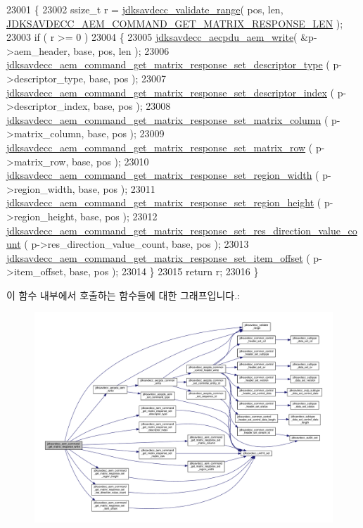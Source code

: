 \begin{DoxyCode}
23001 \{
23002     ssize\_t r = \hyperlink{group__util_ga9c02bdfe76c69163647c3196db7a73a1}{jdksavdecc\_validate\_range}( pos, len, 
      \hyperlink{group__command__get__matrix__response_ga1e5cff1febbf3cdec919f94c81e3161d}{JDKSAVDECC\_AEM\_COMMAND\_GET\_MATRIX\_RESPONSE\_LEN} );
23003     \textcolor{keywordflow}{if} ( r >= 0 )
23004     \{
23005         \hyperlink{group__aecpdu__aem_gad658e55771cce77cecf7aae91e1dcbc5}{jdksavdecc\_aecpdu\_aem\_write}( &p->aem\_header, base, pos, len );
23006         \hyperlink{group__command__get__matrix__response_ga5d3bbb8b993435678aa79add5f92fd32}{jdksavdecc\_aem\_command\_get\_matrix\_response\_set\_descriptor\_type}
      ( p->descriptor\_type, base, pos );
23007         \hyperlink{group__command__get__matrix__response_ga90b5890d1ed3e00d4415a92381daef32}{jdksavdecc\_aem\_command\_get\_matrix\_response\_set\_descriptor\_index}
      ( p->descriptor\_index, base, pos );
23008         \hyperlink{group__command__get__matrix__response_ga9f938d30a1b2d2f60d7cda173386be03}{jdksavdecc\_aem\_command\_get\_matrix\_response\_set\_matrix\_column}
      ( p->matrix\_column, base, pos );
23009         \hyperlink{group__command__get__matrix__response_ga49b1cec10016e943a1315de0c149a62a}{jdksavdecc\_aem\_command\_get\_matrix\_response\_set\_matrix\_row}
      ( p->matrix\_row, base, pos );
23010         \hyperlink{group__command__get__matrix__response_gad476529cadbe62a7665e3906983fb8fc}{jdksavdecc\_aem\_command\_get\_matrix\_response\_set\_region\_width}
      ( p->region\_width, base, pos );
23011         \hyperlink{group__command__get__matrix__response_ga567114d5982537c21f3248a7332de0d1}{jdksavdecc\_aem\_command\_get\_matrix\_response\_set\_region\_height}
      ( p->region\_height, base, pos );
23012         \hyperlink{group__command__get__matrix__response_ga22f5abaa9b2eb23ecfef424496a9c15c}{jdksavdecc\_aem\_command\_get\_matrix\_response\_set\_res\_direction\_value\_count}
      ( p->res\_direction\_value\_count, base, pos );
23013         \hyperlink{group__command__get__matrix__response_gad0927d3215b7128c7a9cfd34b94a89f7}{jdksavdecc\_aem\_command\_get\_matrix\_response\_set\_item\_offset}
      ( p->item\_offset, base, pos );
23014     \}
23015     \textcolor{keywordflow}{return} r;
23016 \}
\end{DoxyCode}


이 함수 내부에서 호출하는 함수들에 대한 그래프입니다.\+:
\nopagebreak
\begin{figure}[H]
\begin{center}
\leavevmode
\includegraphics[width=350pt]{group__command__get__matrix__response_ga90dcbcc647c6280fd0b1e49ce457127c_cgraph}
\end{center}
\end{figure}


